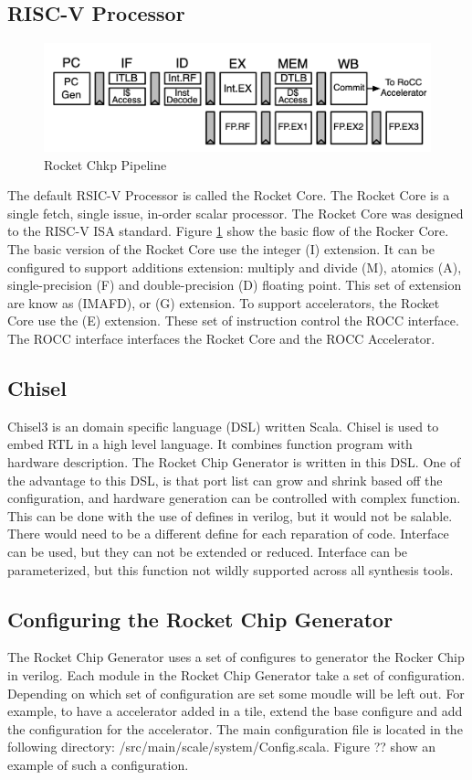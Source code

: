\documentclass[../main.tex]{subfiles}
\begin{document}
\subsection{RISC-V Processor}
\begin{figure}
    \centering
    \includegraphics[scale=.4]{pngs/RocketPipeline.png}
    \caption{Rocket Chkp Pipeline\cite{Asanović:EECS-2016-17}}
    \label{fig:RocketCipFlow}
\end{figure}
The default RSIC-V Processor is called the Rocket Core. The Rocket Core is a single fetch, single issue, in-order scalar processor. The Rocket Core was designed to the RISC-V ISA standard. Figure \ref{fig:RocketCipFlow} show the basic flow of the Rocker Core. The basic version of the Rocket Core use the integer (I) extension. It can be configured to support additions extension: multiply and divide (M), atomics (A), single-precision (F) and double-precision (D) floating point\cite{Asanović:EECS-2016-17}. This set of extension are know as (IMAFD), or (G) extension\cite{Asanović:EECS-2016-17}. To support accelerators, the Rocket Core use the (E) extension. These set of instruction control the ROCC interface. The ROCC interface interfaces the Rocket Core and the ROCC Accelerator.
\subsection{Chisel}
Chisel3 is an domain specific language (DSL) written Scala. Chisel is used to embed RTL in a high level language. It combines function program with hardware description. The Rocket Chip Generator is written in this DSL. One of the advantage to this DSL, is that port list can grow and shrink based off the configuration, and hardware generation can be controlled with complex function. This can be done with the use of defines in verilog, but it would not be salable. There would need to be a different define for each reparation of code. Interface can be used, but they can not be extended or reduced. Interface can be parameterized, but this function not wildly supported across all synthesis tools.  
\subsection{Configuring the Rocket Chip Generator}
The Rocket Chip Generator uses a set of configures to generator the Rocker Chip in verilog. Each module in the Rocket Chip Generator take a set of configuration. Depending on which set of configuration are set some moudle will be left out. For example, to have a accelerator added in a tile, extend the base configure and add the configuration for the accelerator. The main configuration file is located in the following directory: /src/main/scale/system/Config.scala. Figure ?? show an example of such a configuration.
\end{document}
